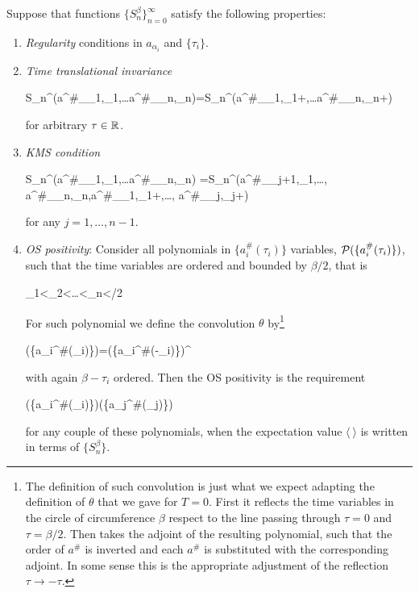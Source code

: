 \documentclass[../main/main.tex]{subfiles}
\begin{document}
\begin{theorem}\label{thm:OS-finite-T} Suppose that functions $\{S_n^\beta\}_{n=0}^\infty$ satisfy the following properties: 

\begin{enumerate}[label=(\arabic*)]
	\item \emph{Regularity} conditions in $a_{\alpha_i}$ and $\{\tau_i\}$.
	\item \emph{Time translational invariance}
	\begin{eq}
		S_n^\beta(a^\#_{\alpha_1},\tau_1,\ldots a^\#_{\alpha_n},\tau_n)=S_n^\beta(a^\#_{\alpha_1},\tau_1+\tau,\ldots a^\#_{\alpha_n},\tau_n+\tau)
	\end{eq}
	for arbitrary $\tau\in\mathbb{R}$.
	\item \emph{KMS condition} 
	\begin{eq}
		S_n^\beta(a^\#_{\alpha_1},\tau_1,\ldots a^\#_{\alpha_n},\tau_n)
		=S_n^\beta(a^\#_{\alpha_{j+1}},\tau_1,\ldots, a^\#_{\alpha_n},\tau_n,a^\#_{\alpha_1},\tau_1+\beta,\ldots, a^\#_{\alpha_j},\tau_j+\beta)
	\end{eq}
	for any $j=1,\ldots,n-1$.
	\item \emph{OS positivity}: Consider all polynomials in $\{a_i^\#(\tau_i)\}$ variables, $\mathcal P(\{a_i^\#(\tau_i)\})$, such that the time variables are ordered and bounded by $\beta/2$, that is
	\begin{eq}
		\tau_1<\tau_2<\ldots<\tau_n<\beta/2
	\end{eq}
	For such polynomial we define the convolution $\theta$ by\footnote{The definition of such convolution is just what we expect adapting the definition of $\theta$ that we gave for $T=0$. First it reflects the time variables in the circle of circumference $\beta$ respect to the line passing through $\tau=0$ and $\tau=\beta/2$. Then takes the adjoint of the resulting polynomial, such that the order of $a^\#$ is inverted and each $a^\#$ is substituted with the corresponding adjoint. In some sense this is the appropriate adjustment of the reflection $\tau\to-\tau$.}
	\begin{eq}
		\theta\polyn(\{a_i^\#(\tau_i)\})=\polyn(\{a_i^\#(\beta-\tau_i)\})^\dagger
	\end{eq}
	with again $\beta-\tau_i$ ordered. Then the OS positivity is the requirement
	\begin{eq}
		\big\langle \polyn(\{a_i^\#(\tau_i)\})\theta \polyn(\{a_j^\#(\tau_j)\})\big\rangle\geq0
	\end{eq}
	for any couple of these polynomials, when the expectation value $\langle\ \rangle$ is written in terms of $\{S_n^\beta\}$. 
\end{enumerate}


\end{theorem}
\end{document}
